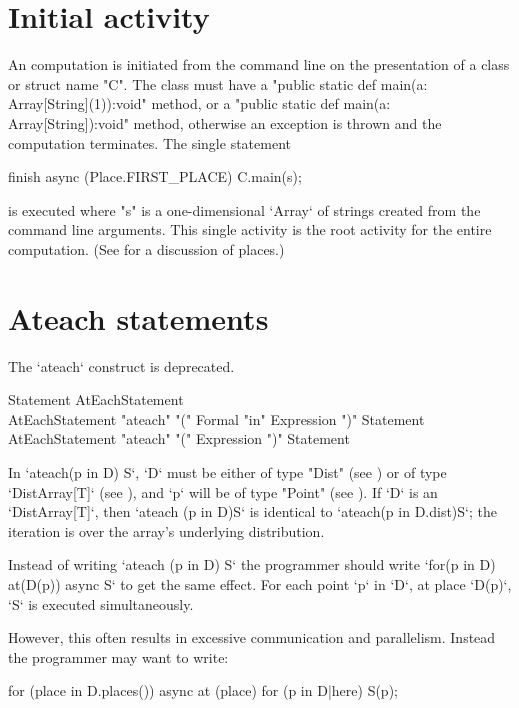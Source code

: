 \section{Initial activity}\label{initial-computation}

An \Xten{} computation is initiated from the command line on the
presentation of a class or struct name \xcd"C". The class must have a
\xcd"public static def main(a: Array[String](1)):void" method, 
or a \xcd"public static def main(a: Array[String]):void" method, 
otherwise an exception is thrown
and the computation terminates.  The single statement
\begin{xten}
finish async (Place.FIRST_PLACE) {
  C.main(s);
}
\end{xten} 
\noindent is executed where \xcd"s" is a one-dimensional \xcd`Array` of
strings created 
from the command line arguments. This single activity is the root activity
for the entire computation. (See  for a discussion of
places.)


\section{Ateach statements}\label{ateach-section}
\deprecated{} The \xcd`ateach` construct is deprecated.
\begin{grammar}
Statement \: AtEachStatement \\
AtEachStatement \:
      \xcd"ateach" \xcd"(" Formal \xcd"in" Expression \xcd")"
         Statement \\
AtEachStatement \:
      \xcd"ateach" \xcd"(" Expression \xcd")"
         Statement 
\end{grammar}
In \xcd`ateach(p in D) S`, \xcd`D` must be either of type \xcd"Dist"
(see ) or of type \xcd`DistArray[T]` (see
), and \xcd`p` will be of type \xcd"Point" (see
). If \xcd`D` is an \xcd`DistArray[T]`, then
\xcd`ateach (p in D)S` is identical to 
\xcd`ateach(p in D.dist)S`; the iteration is over the array's underlying
distribution.   

Instead of writing \xcd`ateach (p in D) S` the programmer should write 
\xcd`for(p in D) at(D(p)) async S` to get the same effect. 
For each point \xcd`p` in \xcd`D`, at place \xcd`D(p)`, \xcd`S` is
executed simultaneously.

However, this often results in excessive communication and parallelism. Instead the
programmer may want to write: 
\begin{xten}
for (place in D.places()) async at (place) {
    for (p in D|here) {
        S(p);
    }
}
\end{xten}

